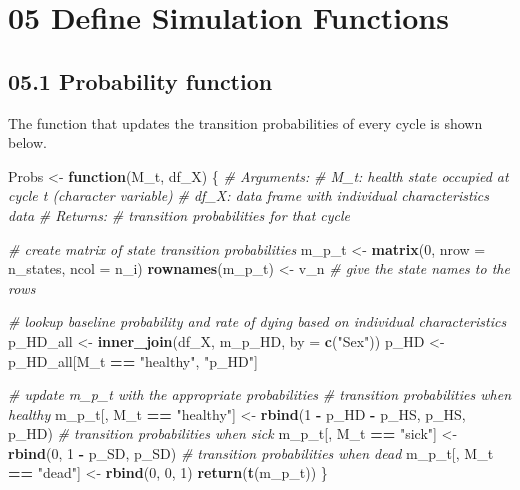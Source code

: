 \documentclass[
]{article}
\newenvironment{Shaded}{\begin{snugshade}}{\end{snugshade}}
\newcommand{\CommentTok}[1]{\textcolor[rgb]{0.56,0.35,0.01}{\textit{#1}}}
\newcommand{\ControlFlowTok}[1]{\textcolor[rgb]{0.13,0.29,0.53}{\textbf{#1}}}
\newcommand{\DataTypeTok}[1]{\textcolor[rgb]{0.13,0.29,0.53}{#1}}
\newcommand{\DecValTok}[1]{\textcolor[rgb]{0.00,0.00,0.81}{#1}}
\newcommand{\KeywordTok}[1]{\textcolor[rgb]{0.13,0.29,0.53}{\textbf{#1}}}
\newcommand{\NormalTok}[1]{#1}
\newcommand{\OperatorTok}[1]{\textcolor[rgb]{0.81,0.36,0.00}{\textbf{#1}}}
\newcommand{\StringTok}[1]{\textcolor[rgb]{0.31,0.60,0.02}{#1}}
\begin{document}
\hypertarget{define-simulation-functions}{%
\section{05 Define Simulation
Functions}\label{define-simulation-functions}}

\hypertarget{probability-function}{%
\subsection{05.1 Probability function}\label{probability-function}}

The function that updates the transition probabilities of every cycle is
shown below.

\begin{Shaded}
\begin{Highlighting}[]
\NormalTok{Probs <-}\StringTok{ }\ControlFlowTok{function}\NormalTok{(M_t, df_X) \{ }
  \CommentTok{# Arguments:}
    \CommentTok{# M_t:  health state occupied at cycle t (character variable)}
    \CommentTok{# df_X: data frame with individual characteristics data  }
  \CommentTok{# Returns: }
    \CommentTok{# transition probabilities for that cycle}
  
  \CommentTok{# create matrix of state transition probabilities}
\NormalTok{  m_p_t           <-}\StringTok{ }\KeywordTok{matrix}\NormalTok{(}\DecValTok{0}\NormalTok{, }\DataTypeTok{nrow =}\NormalTok{ n_states, }\DataTypeTok{ncol =}\NormalTok{ n_i)  }
  \KeywordTok{rownames}\NormalTok{(m_p_t) <-}\StringTok{  }\NormalTok{v_n  }\CommentTok{# give the state names to the rows}
  
  \CommentTok{# lookup baseline probability and rate of dying based on individual characteristics}
\NormalTok{  p_HD_all <-}\StringTok{ }\KeywordTok{inner_join}\NormalTok{(df_X, m_p_HD, }\DataTypeTok{by =} \KeywordTok{c}\NormalTok{(}\StringTok{"Sex"}\NormalTok{))}
\NormalTok{  p_HD     <-}\StringTok{ }\NormalTok{p_HD_all[M_t }\OperatorTok{==}\StringTok{ "healthy"}\NormalTok{, }\StringTok{"p_HD"}\NormalTok{]}
  
  \CommentTok{# update m_p_t with the appropriate probabilities   }
  \CommentTok{# transition probabilities when healthy }
\NormalTok{  m_p_t[, M_t }\OperatorTok{==}\StringTok{ "healthy"}\NormalTok{] <-}\StringTok{ }\KeywordTok{rbind}\NormalTok{(}\DecValTok{1} \OperatorTok{-}\StringTok{ }\NormalTok{p_HD }\OperatorTok{-}\StringTok{ }\NormalTok{p_HS, p_HS, p_HD)  }
  \CommentTok{# transition probabilities when sick }
\NormalTok{  m_p_t[, M_t }\OperatorTok{==}\StringTok{ "sick"}\NormalTok{]    <-}\StringTok{ }\KeywordTok{rbind}\NormalTok{(}\DecValTok{0}\NormalTok{, }\DecValTok{1} \OperatorTok{-}\StringTok{ }\NormalTok{p_SD, p_SD)          }
  \CommentTok{# transition probabilities when dead}
\NormalTok{  m_p_t[, M_t }\OperatorTok{==}\StringTok{ "dead"}\NormalTok{]    <-}\StringTok{ }\KeywordTok{rbind}\NormalTok{(}\DecValTok{0}\NormalTok{, }\DecValTok{0}\NormalTok{, }\DecValTok{1}\NormalTok{)                         }
  \KeywordTok{return}\NormalTok{(}\KeywordTok{t}\NormalTok{(m_p_t))}
\NormalTok{\}     }
\end{Highlighting}
\end{Shaded}
\end{document}
